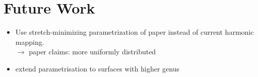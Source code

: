 \section{Future Work}
\begin{itemize}
\item Use stretch-minimizing parametrization of paper \cite{gu2002geometry} instead of current harmonic mapping. \\
$\rightarrow$ paper claims: more uniformly distributed 
\item extend parametrisation to surfaces with higher genus
\end{itemize}
